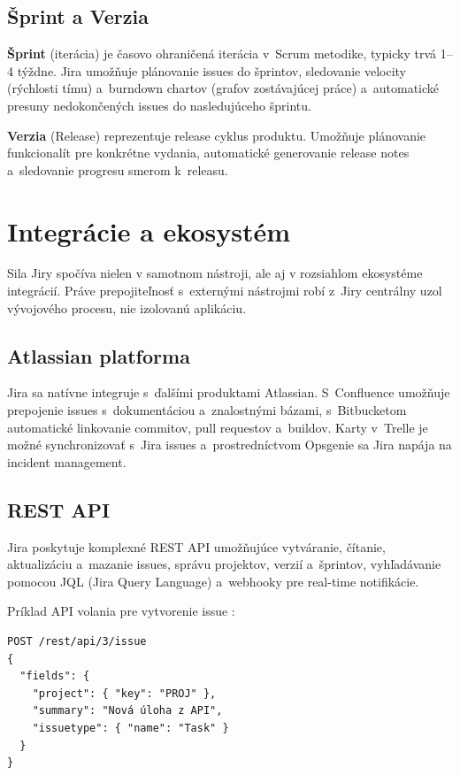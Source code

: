 \subsection{Šprint a Verzia}

\textbf{Šprint} (iterácia) je časovo ohraničená iterácia v~Scrum metodike, typicky trvá 1--4 týždne. Jira umožňuje plánovanie issues do šprintov, sledovanie velocity (rýchlosti tímu) a~burndown chartov (grafov zostávajúcej práce) a~automatické presuny nedokončených issues do nasledujúceho šprintu.

\textbf{Verzia} (Release) reprezentuje release cyklus produktu. Umožňuje plánovanie funkcionalít pre konkrétne vydania, automatické generovanie release notes a~sledovanie progresu smerom k~releasu.

\section{Integrácie a ekosystém}

Sila Jiry spočíva nielen v samotnom nástroji, ale aj v rozsiahlom ekosystéme integrácií. Práve prepojiteľnosť s~externými nástrojmi robí z~Jiry centrálny uzol vývojového procesu, nie izolovanú aplikáciu.

\subsection{Atlassian platforma}

Jira sa natívne integruje s~ďalšími produktami Atlassian. S~Confluence umožňuje prepojenie issues s~dokumentáciou a~znalostnými bázami, s~Bitbucketom automatické linkovanie commitov, pull requestov a~buildov. Karty v~Trelle je možné synchronizovať s~Jira issues a~prostredníctvom Opsgenie sa Jira napája na incident management.

\subsection{REST API}

Jira poskytuje komplexné REST API umožňujúce vytváranie, čítanie, aktualizáciu a~mazanie issues, správu projektov, verzií a~šprintov, vyhľadávanie pomocou JQL (Jira Query Language) a~webhooky pre real-time notifikácie.

Príklad API volania pre vytvorenie issue \cite{atlassian_api2024}:

\begin{verbatim}
POST /rest/api/3/issue
{
  "fields": {
    "project": { "key": "PROJ" },
    "summary": "Nová úloha z API",
    "issuetype": { "name": "Task" }
  }
}
\end{verbatim}

